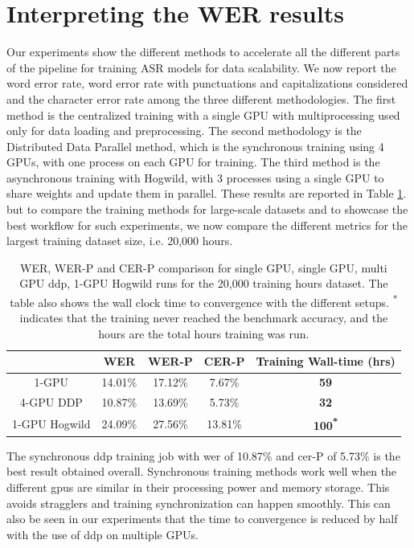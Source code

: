 \section{Interpreting the WER results}
\label{section:20000wer}
Our experiments show the different methods to accelerate all the different parts of the pipeline for training ASR models for data scalability. We now report the word error rate, word error rate with punctuations and capitalizations considered and the character error rate among the three different methodologies. The first method is the centralized training with a single GPU with multiprocessing used only for data loading and preprocessing. The second methodology is the Distributed Data Parallel method, which is the synchronous training using 4 GPUs, with one process on each GPU for training. The third method is the asynchronous training with Hogwild, with 3 processes using a single GPU to share weights and update them in parallel. These results are reported in Table \ref{table:overall_wer}. but to compare the training methods for large-scale datasets and to showcase the best workflow for such experiments, we now compare the different metrics for the largest training dataset size, i.e. 20,000 hours. 
\begin{table}[ht]
\centering
\begin{tabular}{c | c c c | c }
\hline
     & WER & WER-P & CER-P & Training Wall-time (hrs)\\
 \hline
  1-GPU & 14.01\% & 17.12\% & 7.67\% & \textbf{59} \\
  4-GPU DDP & 10.87\% & 13.69\% & 5.73\% & \textbf{32} \\
  1-GPU Hogwild & 24.09\% & 27.56\% & 13.81\% & \textbf{100\textsuperscript{*}} \\
 \hline
\end{tabular}
\caption{\label{table:overall_wer} WER, WER-P and CER-P comparison for single GPU, single GPU, multi GPU \acrshort{ddp}, 1-GPU Hogwild runs for the 20,000 training hours dataset. The table also shows the wall clock time to convergence with the different setups. \textsuperscript{*} indicates that the training never reached the benchmark accuracy, and the hours are the total hours training was run.}
\end{table}

The synchronous \acrshort{ddp} training job with \acrshort{wer} of 10.87\% and \acrshort{cer}-P of 5.73\% is the best result obtained overall. Synchronous training methods work well when the different \acrshort{gpu}s are similar in their processing power and memory storage. This avoids stragglers and training synchronization can happen smoothly. This can also be seen in our experiments that the time to convergence is reduced by half with the use of \acrshort{ddp} on multiple GPUs. 

